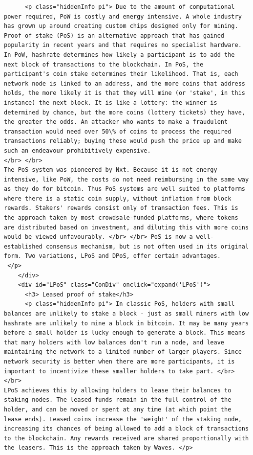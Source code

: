 \begin{lstlisting}
      <p class="hiddenInfo pi"> Due to the amount of computational power required, PoW is costly and energy intensive. A whole industry has grown up around creating custom chips designed only for mining. Proof of stake (PoS) is an alternative approach that has gained popularity in recent years and that requires no specialist hardware. In PoW, hashrate determines how likely a participant is to add the next block of transactions to the blockchain. In PoS, the participant's coin stake determines their likelihood. That is, each network node is linked to an address, and the more coins that address holds, the more likely it is that they will mine (or 'stake', in this instance) the next block. It is like a lottery: the winner is determined by chance, but the more coins (lottery tickets) they have, the greater the odds. An attacker who wants to make a fraudulent transaction would need over 50\% of coins to process the required transactions reliably; buying these would push the price up and make such an endeavour prohibitively expensive.
</br> </br>
The PoS system was pioneered by Nxt. Because it is not energy-intensive, like PoW, the costs do not need reimbursing in the same way as they do for bitcoin. Thus PoS systems are well suited to platforms where there is a static coin supply, without inflation from block rewards. Stakers' rewards consist only of transaction fees. This is the approach taken by most crowdsale-funded platforms, where tokens are distributed based on investment, and diluting this with more coins would be viewed unfavourably. </br> </br> PoS is now a well-established consensus mechanism, but is not often used in its original form. Two variations, LPoS and DPoS, offer certain advantages.
 </p>
    </div>
    <div id="LPoS" class="ConDiv" onclick="expand('LPoS')">
      <h3> Leased proof of stake</h3>
      <p class="hiddenInfo pi"> In classic PoS, holders with small balances are unlikely to stake a block - just as small miners with low hashrate are unlikely to mine a block in bitcoin. It may be many years before a small holder is lucky enough to generate a block. This means that many holders with low balances don't run a node, and leave maintaining the network to a limited number of larger players. Since network security is better when there are more participants, it is important to incentivize these smaller holders to take part. </br> </br>
LPoS achieves this by allowing holders to lease their balances to staking nodes. The leased funds remain in the full control of the holder, and can be moved or spent at any time (at which point the lease ends). Leased coins increase the 'weight' of the staking node, increasing its chances of being allowed to add a block of transactions to the blockchain. Any rewards received are shared proportionally with the leasers. This is the approach taken by Waves. </p>

\end{lstlisting}
